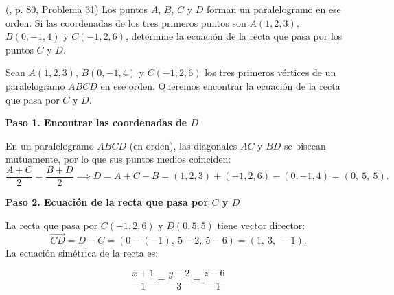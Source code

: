\begin{prob} (\cite{espinoza2006Algebralineal}, p. 80, Problema 31) Los puntos $A$, $B$, $C$ y $D$ forman un paralelogramo en ese orden. Si las coordenadas de los tres primeros puntos son $A(1,2,3)$, $B(0,-1,4)$ y $C(-1,2,6)$, determine la ecuación de la recta que pasa por los puntos $C$ y $D$. 

\begin{myproof}
Sean $A(1,2,3)$, $B(0,-1,4)$ y $C(-1,2,6)$ los tres primeros vértices de un paralelogramo $ABCD$ en ese orden. Queremos encontrar la ecuación de la recta que pasa por $C$ y $D$.

\textbf{Paso 1. Encontrar las coordenadas de $D$}

En un paralelogramo $ABCD$ (en orden), las diagonales $AC$ y $BD$ se bisecan mutuamente, por lo que sus puntos medios coinciden:
\[
\frac{A+C}{2} = \frac{B+D}{2} \implies D = A + C - B = (1,2,3)+(-1,2,6)-(0,-1,4) = (0,\ 5,\ 5).
\]

\textbf{Paso 2. Ecuación de la recta que pasa por $C$ y $D$}

La recta que pasa por $C(-1,2,6)$ y $D(0,5,5)$ tiene vector director:
\[
\overrightarrow{CD} = D - C = (0-(-1),\ 5-2,\ 5-6) = (1,\ 3,\ -1).
\]
La ecuación simétrica de la recta es:

\[
\boxed{
\frac{x + 1}{1} = \frac{y - 2}{3} = \frac{z - 6}{-1}
}
\]
\end{myproof}

\end{prob}

